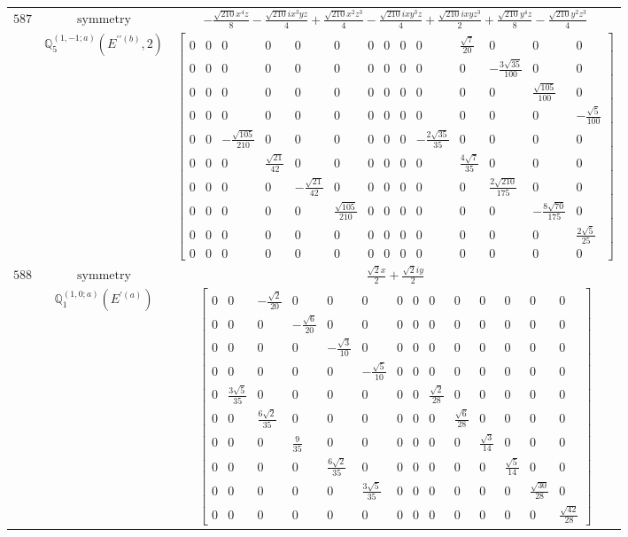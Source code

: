 \documentclass[fleqn,8pt,landscape]{jsarticle}
\begin{document}
\begin{longtable}{ccc}
$ 587 $ & $ \text{symmetry} $ & $ - \frac{\sqrt{210} x^{4} z}{8} - \frac{\sqrt{210} i x^{3} y z}{4} + \frac{\sqrt{210} x^{2} z^{3}}{4} - \frac{\sqrt{210} i x y^{3} z}{4} + \frac{\sqrt{210} i x y z^{3}}{2} + \frac{\sqrt{210} y^{4} z}{8} - \frac{\sqrt{210} y^{2} z^{3}}{4} $ \\
$  $ & $ \mathbb{Q}_{5}^{(1,-1;a)}(E^{\prime\prime(b)},2) $ & $ \begin{bmatrix} 0 & 0 & 0 & 0 & 0 & 0 & 0 & 0 & 0 & 0 & \frac{\sqrt{7}}{20} & 0 & 0 & 0 \\ 0 & 0 & 0 & 0 & 0 & 0 & 0 & 0 & 0 & 0 & 0 & - \frac{3 \sqrt{35}}{100} & 0 & 0 \\ 0 & 0 & 0 & 0 & 0 & 0 & 0 & 0 & 0 & 0 & 0 & 0 & \frac{\sqrt{105}}{100} & 0 \\ 0 & 0 & 0 & 0 & 0 & 0 & 0 & 0 & 0 & 0 & 0 & 0 & 0 & - \frac{\sqrt{5}}{100} \\ 0 & 0 & - \frac{\sqrt{105}}{210} & 0 & 0 & 0 & 0 & 0 & 0 & - \frac{2 \sqrt{35}}{35} & 0 & 0 & 0 & 0 \\ 0 & 0 & 0 & \frac{\sqrt{21}}{42} & 0 & 0 & 0 & 0 & 0 & 0 & \frac{4 \sqrt{7}}{35} & 0 & 0 & 0 \\ 0 & 0 & 0 & 0 & - \frac{\sqrt{21}}{42} & 0 & 0 & 0 & 0 & 0 & 0 & \frac{2 \sqrt{210}}{175} & 0 & 0 \\ 0 & 0 & 0 & 0 & 0 & \frac{\sqrt{105}}{210} & 0 & 0 & 0 & 0 & 0 & 0 & - \frac{8 \sqrt{70}}{175} & 0 \\ 0 & 0 & 0 & 0 & 0 & 0 & 0 & 0 & 0 & 0 & 0 & 0 & 0 & \frac{2 \sqrt{5}}{25} \\ 0 & 0 & 0 & 0 & 0 & 0 & 0 & 0 & 0 & 0 & 0 & 0 & 0 & 0 \end{bmatrix} $ \\ \hline
$ 588 $ & $ \text{symmetry} $ & $ \frac{\sqrt{2} x}{2} + \frac{\sqrt{2} i y}{2} $ \\
$  $ & $ \mathbb{Q}_{1}^{(1,0;a)}(E^{\prime(a)}) $ & $ \begin{bmatrix} 0 & 0 & - \frac{\sqrt{2}}{20} & 0 & 0 & 0 & 0 & 0 & 0 & 0 & 0 & 0 & 0 & 0 \\ 0 & 0 & 0 & - \frac{\sqrt{6}}{20} & 0 & 0 & 0 & 0 & 0 & 0 & 0 & 0 & 0 & 0 \\ 0 & 0 & 0 & 0 & - \frac{\sqrt{3}}{10} & 0 & 0 & 0 & 0 & 0 & 0 & 0 & 0 & 0 \\ 0 & 0 & 0 & 0 & 0 & - \frac{\sqrt{5}}{10} & 0 & 0 & 0 & 0 & 0 & 0 & 0 & 0 \\ 0 & \frac{3 \sqrt{5}}{35} & 0 & 0 & 0 & 0 & 0 & 0 & \frac{\sqrt{2}}{28} & 0 & 0 & 0 & 0 & 0 \\ 0 & 0 & \frac{6 \sqrt{2}}{35} & 0 & 0 & 0 & 0 & 0 & 0 & \frac{\sqrt{6}}{28} & 0 & 0 & 0 & 0 \\ 0 & 0 & 0 & \frac{9}{35} & 0 & 0 & 0 & 0 & 0 & 0 & \frac{\sqrt{3}}{14} & 0 & 0 & 0 \\ 0 & 0 & 0 & 0 & \frac{6 \sqrt{2}}{35} & 0 & 0 & 0 & 0 & 0 & 0 & \frac{\sqrt{5}}{14} & 0 & 0 \\ 0 & 0 & 0 & 0 & 0 & \frac{3 \sqrt{5}}{35} & 0 & 0 & 0 & 0 & 0 & 0 & \frac{\sqrt{30}}{28} & 0 \\ 0 & 0 & 0 & 0 & 0 & 0 & 0 & 0 & 0 & 0 & 0 & 0 & 0 & \frac{\sqrt{42}}{28} \end{bmatrix} $ \\ \hline

\end{longtable}
\end{document}
